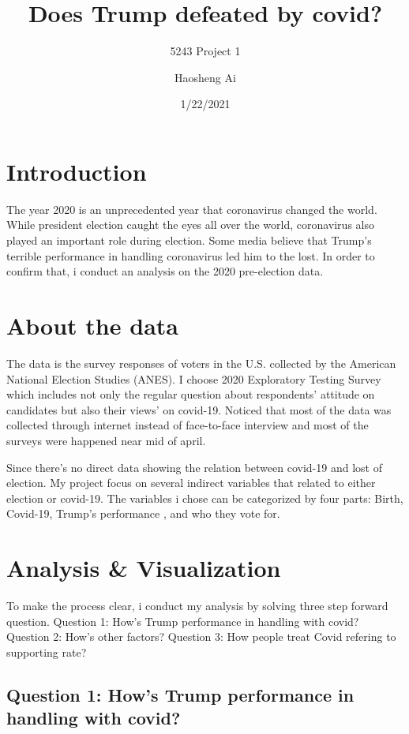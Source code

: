 \documentclass[
]{article}
\title{Does Trump defeated by covid?}
\subtitle{5243 Project 1}
\author{Haosheng Ai}
\date{1/22/2021}
\begin{document}
\maketitle

\hypertarget{introduction}{%
\section{Introduction}\label{introduction}}

The year 2020 is an unprecedented year that coronavirus changed the
world. While president election caught the eyes all over the world,
coronavirus also played an important role during election. Some media
believe that Trump's terrible performance in handling coronavirus led
him to the lost. In order to confirm that, i conduct an analysis on the
2020 pre-election data.

\hypertarget{about-the-data}{%
\section{About the data}\label{about-the-data}}

The data is the survey responses of voters in the U.S. collected by the
American National Election Studies (ANES). I choose 2020 Exploratory
Testing Survey which includes not only the regular question about
respondents' attitude on candidates but also their views' on covid-19.
Noticed that most of the data was collected through internet instead of
face-to-face interview and most of the surveys were happened near mid of
april.

Since there's no direct data showing the relation between covid-19 and
lost of election. My project focus on several indirect variables that
related to either election or covid-19. The variables i chose can be
categorized by four parts: Birth, Covid-19, Trump's performance , and
who they vote for.

\hypertarget{analysis-visualization}{%
\section{Analysis \& Visualization}\label{analysis-visualization}}

To make the process clear, i conduct my analysis by solving three step
forward question. Question 1: How's Trump performance in handling with
covid? Question 2: How's other factors? Question 3: How people treat
Covid refering to supporting rate?

\hypertarget{question-1-hows-trump-performance-in-handling-with-covid}{%
\subsection{Question 1: How's Trump performance in handling with
covid?}\label{question-1-hows-trump-performance-in-handling-with-covid}}
\end{document}
